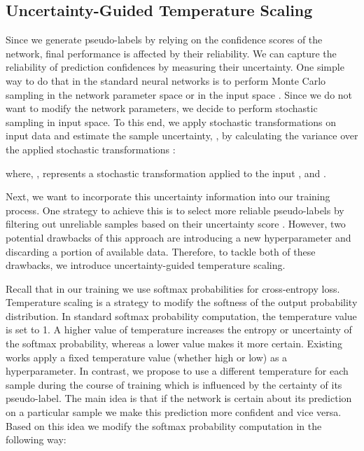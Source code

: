 \documentclass[runningheads]{eccv2022submission}
\begin{document}
\subsection{Uncertainty-Guided Temperature Scaling}
\label{sec:uncr-temp}
Since we generate pseudo-labels by relying on the confidence scores of the network, final performance is affected by their reliability. We can capture the reliability of prediction confidences by measuring their uncertainty. One simple way to do that in the standard neural networks is to perform Monte Carlo sampling in the network parameter space \cite{gal2016dropout} or in the input space \cite{ayhan2018,rizve2021in}. Since we do not want to modify the network parameters, we decide to perform stochastic sampling in input space. To this end, we apply stochastic transformations on input data  and estimate the sample uncertainty, , by calculating the variance over the applied stochastic transformations \cite{feinman2017detecting,NEURIPS2020_f23d125d,rizve2021in}:


\setlength{\abovedisplayskip}{-6pt}
\setlength{\belowdisplayskip}{2pt}
\setlength{\abovedisplayshortskip}{0pt}
\setlength{\belowdisplayshortskip}{0pt}



\noindent where, ,  represents a stochastic transformation applied to the input , and .


Next, we want to incorporate this uncertainty information into our training process. One strategy to achieve this is to select more reliable pseudo-labels by filtering out unreliable samples based on their uncertainty score \cite{rizve2021in}. However, two potential drawbacks of this approach are introducing a new hyperparameter and discarding a portion of available data. Therefore, to tackle both of these drawbacks, we introduce uncertainty-guided temperature scaling.   

Recall that in our training we use softmax probabilities for cross-entropy loss. Temperature scaling is a strategy to modify the softness of the output probability distribution. In standard softmax probability computation, the temperature value is set to 1. A higher value of temperature increases the entropy or uncertainty of the softmax probability, whereas a lower value makes it more certain. Existing works \cite{cao2022openworld,fini2021unified,chen2020simple,khosla2020supervised} apply a fixed temperature value (whether high or low) as a hyperparameter. In contrast, we propose to use a different temperature for each sample during the course of training which is influenced by the certainty of its pseudo-label. The main idea is that if the network is certain about its prediction on a particular sample we make this prediction more confident and vice versa. Based on this idea we modify the softmax probability computation in the following way:
\end{document}
